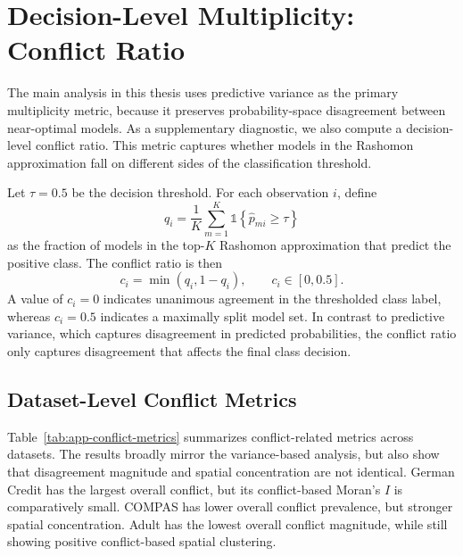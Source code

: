 \section{Decision-Level Multiplicity: Conflict Ratio}
\label{app:conflict-ratio}

The main analysis in this thesis uses predictive variance as the primary multiplicity
metric, because it preserves probability-space disagreement between near-optimal
models. As a supplementary diagnostic, we also compute a decision-level conflict ratio.
This metric captures whether models in the Rashomon approximation fall on different
sides of the classification threshold.

Let $\tau = 0.5$ be the decision threshold. For each observation $i$, define
\[
q_i =
\frac{1}{K}
\sum_{m=1}^{K}
\mathds{1}\!\left\{\hat p_{mi} \ge \tau\right\}
\]
as the fraction of models in the top-$K$ Rashomon approximation that predict the
positive class. The conflict ratio is then
\[
c_i = \min(q_i, 1-q_i), \qquad c_i \in [0,0.5].
\]
A value of $c_i = 0$ indicates unanimous agreement in the thresholded class label,
whereas $c_i = 0.5$ indicates a maximally split model set. In contrast to predictive
variance, which captures disagreement in predicted probabilities, the conflict ratio only
captures disagreement that affects the final class decision.

\subsection{Dataset-Level Conflict Metrics}
\label{app:conflict-dataset-level}

Table~\ref{tab:app-conflict-metrics} summarizes conflict-related metrics across datasets.
The results broadly mirror the variance-based analysis, but also show that disagreement
magnitude and spatial concentration are not identical. German Credit has the largest
overall conflict, but its conflict-based Moran's $I$ is comparatively small. COMPAS has
lower overall conflict prevalence, but stronger spatial concentration. Adult has the lowest
overall conflict magnitude, while still showing positive conflict-based spatial clustering.

\begin{table}[htbp]
\centering
\caption{Conflict metrics by dataset (mean $\pm$ standard deviation over 10 runs, global top-$K$ ($K=25$),
dataset-specific $k$).}
\label{tab:app-conflict-metrics}
\small

\end{table}

